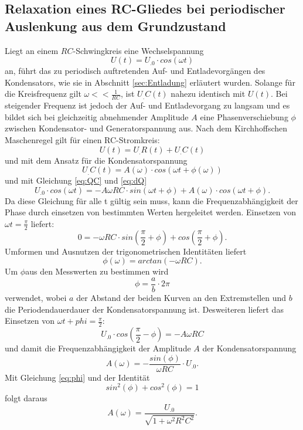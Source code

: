 \subsection{Relaxation eines RC-Gliedes bei periodischer Auslenkung aus dem Grundzustand}
Liegt an einem $RC$-Schwingkreis eine Wechselspannung
\[
U(t)= U_.0\cdot cos(\omega t)
\]
an, führt das zu periodisch auftretenden Auf- und Entladevorgängen des Kondensators, wie sie in Abschnitt \ref{sec:Entladung} erläutert wurden.
Solange für die Kreisfrequenz gilt $\omega << \frac{1}{RC}$, ist $U_.C(t)$ nahezu identisch mit $U(t)$. Bei steigender Frequenz ist jedoch der Auf- und Entladevorgang zu langsam und es bildet sich bei gleichzeitig abnehmender Amplitude $A$ eine Phasenverschiebung $\phi$ zwischen Kondensator- und Generatorspannung aus.
Nach dem Kirchhoffschen Maschenregel gilt für einen RC-Stromkreis:
\begin{equation}
U(t)=U_.R(t)+U_.C(t)\label{eq:U1}
\end{equation}
und mit dem Ansatz für die Kondensatorspannung
\[
U_.C(t)= A(\omega)\cdot cos(\omega t + \phi (\omega))
\]
und mit Gleichung \eqref{eq:QC} und \eqref{eq:dQ}
\begin{equation}
U_.0\cdot cos(\omega t) = -A\omega RC\cdot sin(\omega t + \phi) + A(\omega)\cdot cos(\omega t + \phi)\text{.}\label{eq:U2}
\end{equation}
Da diese Gleichung für alle t gültig sein muss, kann die Frequenzabhängigkeit der Phase durch einsetzen von bestimmten Werten hergeleitet werden.
Einsetzen von $\omega t=\frac{\pi}{2}$ liefert:
\[
0 = -\omega RC\cdot sin\left(\frac{\pi}{2}+\phi\right)+ cos\left(\frac{\pi}{2}+\phi\right)\text{.}
\]
Umformen und Ausnutzen der trigonometrischen Identitäten liefert
\begin{equation}
\phi (\omega)= arctan(-\omega RC)\text{.}\label{eq:phi}
\end{equation}
Um $\phi$aus den Messwerten zu bestimmen wird
\begin{equation}
\phi = \frac{a}{b}\cdot 2\pi \label{eq:phi1}
\end{equation}
verwendet, wobei $a$ der Abstand der beiden Kurven an den Extremstellen und $b$ die Periodendauerdauer der Kondensatorspannung ist.
Desweiteren liefert das Einsetzen von $\omega t + phi = \frac{\pi}{2}$:
\[
U_.0\cdot cos\left(\frac{\pi}{2}-\phi\right)= -A\omega RC
\]
und damit die Frequenzabhängigkeit der Amplitude $A$ der Kondensatorspannung
\begin{equation}
A(\omega)=-\frac{sin(\phi)}{\omega RC}\cdot U_.0 \text{.}\label{eq:A1}
\end{equation}
Mit Gleichung \eqref{eq:phi} und der Identität
\[
sin^2(\phi)+cos^2(\phi)=1
\]
folgt daraus
\begin{equation}
A(\omega)=\frac{U_.0}{\sqrt{1+\omega^2R^2C^2}}\text{.}\label{eq:A2}
\end{equation}
